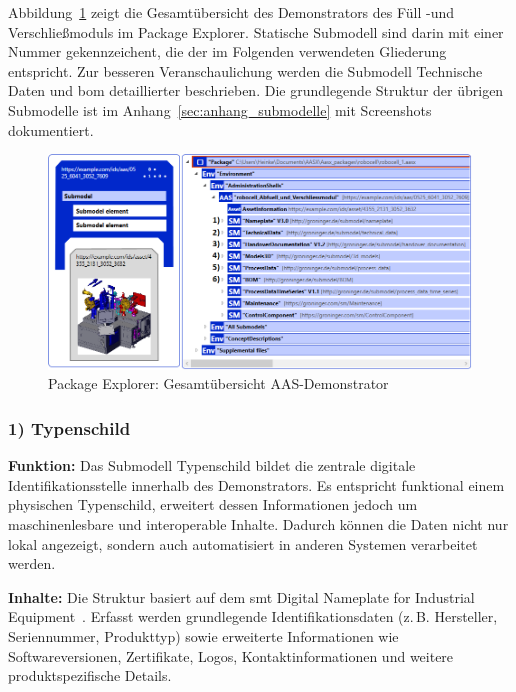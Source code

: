 Abbildung~\ref{fig:PackageExplorerRobocell} zeigt die Gesamtübersicht des Demonstrators des Füll -und Verschließmoduls im Package Explorer.
Statische Submodell sind darin mit einer Nummer gekennzeichent, die der im Folgenden verwendeten Gliederung entspricht.
Zur besseren Veranschaulichung werden die Submodell Technische Daten und \acs{bom} detaillierter beschrieben.
Die grundlegende Struktur der übrigen Submodelle ist im Anhang~\ref{sec:anhang_submodelle} mit Screenshots dokumentiert.

\begin{figure}[htbp]
    \centering
        \includegraphics[width=1\textwidth]{Bilder/ErgebnissePackageExplorer/AASrobocell.PNG}
    \caption{Package Explorer: Gesamtübersicht AAS-Demonstrator}
    \label{fig:PackageExplorerRobocell}
\end{figure}

\subsubsection*{1) Typenschild}
\vspace{-0.5em}
\textbf{Funktion:}  
Das Submodell Typenschild bildet die zentrale digitale Identifikationsstelle innerhalb des Demonstrators. 
Es entspricht funktional einem physischen Typenschild, erweitert dessen Informationen jedoch um maschinenlesbare und interoperable Inhalte. 
Dadurch können die Daten nicht nur lokal angezeigt, sondern auch automatisiert in anderen Systemen verarbeitet werden.

\textbf{Inhalte:}  
Die Struktur basiert auf dem \acs{smt} Digital Nameplate for Industrial Equipment~\cite{SpezifikationTypenschild}.  
Erfasst werden grundlegende Identifikationsdaten (z.\,B. Hersteller, Seriennummer, Produkttyp) 
sowie erweiterte Informationen wie Softwareversionen, Zertifikate, Logos, Kontaktinformationen 
und weitere produktspezifische Details.

